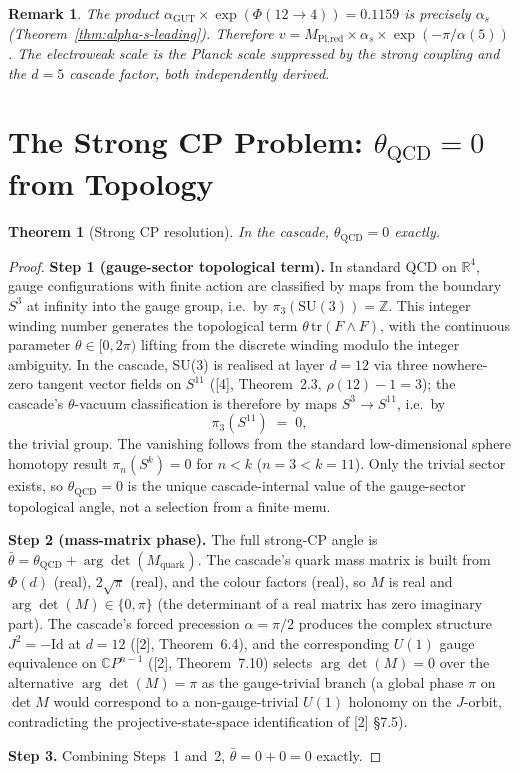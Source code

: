 \documentclass[12pt,a4paper]{article}
\newtheorem{theorem}{Theorem}[section]
\newtheorem*{remark}{Remark}
\begin{document}
\begin{remark}
The product $\alpha_{\text{GUT}} \times \exp(\Phi(12 \to 4)) = 0.1159$ is precisely $\alpha_s$ (Theorem~\ref{thm:alpha-s-leading}). Therefore $v = M_{\text{Pl,red}} \times \alpha_s \times \exp(-\pi/\alpha(5))$. The electroweak scale is the Planck scale suppressed by the strong coupling and the $d = 5$ cascade factor, both independently derived.
\end{remark}

\section{The Strong CP Problem: \texorpdfstring{$\theta_{\text{QCD}\label{sec:the-strong-cp-problem-qcd}} = 0$}{theta\_QCD = 0} from Topology}

\begin{theorem}[Strong CP resolution]\label{thm:strong-cp}
In the cascade, $\theta_{\text{QCD}} = 0$ exactly.
\end{theorem}

\begin{proof}
\textbf{Step 1 (gauge-sector topological term).} In standard QCD on $\mathbb{R}^4$, gauge configurations with finite action are classified by maps from the boundary $S^3$ at infinity into the gauge group, i.e.\ by $\pi_3(\text{SU}(3)) = \mathbb{Z}$. This integer winding number generates the topological term $\theta\,\text{tr}(F\wedge F)$, with the continuous parameter $\theta \in [0, 2\pi)$ lifting from the discrete winding modulo the integer ambiguity. In the cascade, SU(3) is realised at layer $d = 12$ via three nowhere-zero tangent vector fields on $S^{11}$ ([4], Theorem~2.3, $\rho(12)-1 = 3$); the cascade's $\theta$-vacuum classification is therefore by maps $S^3 \to S^{11}$, i.e.\ by
\[
\pi_3(S^{11}) \;=\; 0,
\]
the trivial group. The vanishing follows from the standard low-dimensional sphere homotopy result $\pi_n(S^k) = 0$ for $n < k$ ($n = 3 < k = 11$). Only the trivial sector exists, so $\theta_{\text{QCD}} = 0$ is the unique cascade-internal value of the gauge-sector topological angle, not a selection from a finite menu.

\textbf{Step 2 (mass-matrix phase).} The full strong-CP angle is $\bar\theta = \theta_{\text{QCD}} + \arg\det(M_{\text{quark}})$. The cascade's quark mass matrix is built from $\Phi(d)$ (real), $2\sqrt{\pi}$ (real), and the colour factors (real), so $M$ is real and $\arg\det(M) \in \{0, \pi\}$ (the determinant of a real matrix has zero imaginary part). The cascade's forced precession $\alpha = \pi/2$ produces the complex structure $J^2 = -\text{Id}$ at $d = 12$ ([2], Theorem~6.4), and the corresponding $U(1)$ gauge equivalence on $\mathbb{C}P^{n-1}$ ([2], Theorem~7.10) selects $\arg\det(M) = 0$ over the alternative $\arg\det(M) = \pi$ as the gauge-trivial branch (a global phase $\pi$ on $\det M$ would correspond to a non-gauge-trivial $U(1)$ holonomy on the $J$-orbit, contradicting the projective-state-space identification of [2] \S7.5).

\textbf{Step 3.} Combining Steps~1 and~2, $\bar\theta = 0 + 0 = 0$ exactly.
\end{proof}
\end{document}
